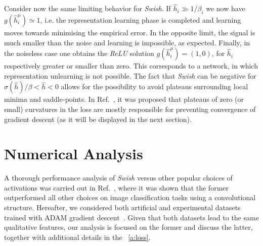 \documentclass{article}
\begin{document}
Consider now the same limiting behavior for {\it Swish}. If $\hat{h}_i \gg 1/\beta_i$ we now have $g(\hat{h}^{\mu}_i)\simeq 1$, i.e. the representation learning phase is completed and learning moves towards minimising the empirical error. In the opposite limit, the signal is much smaller than the noise and learning is impossible, as expected. Finally, in the noiseless case one obtains the {\it ReLU} solution $g(\hat{h}^{\mu}_i) = (1, 0) $, for $\hat{h}_i $ respectively greater or smaller than zero. This corresponds to a network, in which representation unlearning is not possible. The fact that {\it Swish} can be negative for $\sigma(\hat{h})/\beta <\hat{h}<0$ allows for the possibility to avoid plateaus surrounding local minima and saddle-points. In Ref.~\cite{dauphin}, it was proposed that plateaus of zero (or small) curvatures in the loss are mostly responsible for preventing convergence of gradient descent (as it will be displayed in the next section). %
%
\section{Numerical Analysis}
%
A thorough performance analysis of {\it Swish} versus other popular choices of activations was carried out in Ref.~\cite{prajit}, where it was shown that the former outperformed all other choices on image classification tasks using a convolutional structure.%
Hereafter,  we considered both artificial and experimental datasets trained with ADAM gradient descent~\cite{adam}. 
Given that both datasets lead to the same qualitative features, our analysis is focused on the former and discuss the latter, together with additional details in the ~\eqref{a:loss}.
\end{document}
